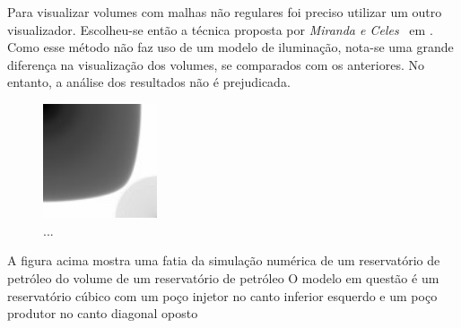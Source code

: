 	Para visualizar volumes com malhas não regulares foi preciso utilizar um outro visualizador. Escolheu-se então a técnica proposta por \textit{Miranda e Celes}~\cite{miranda} em . Como esse método não faz uso de um modelo de iluminação, nota-se uma grande diferença na visualização dos volumes, se comparados com os anteriores. No entanto, a análise dos resultados não é prejudicada.
	
\begin{figure}[h]
	\centering
	\includegraphics[width=0.3\textwidth]{images/r_vrep_so_slice}
	\caption{...}
\end{figure}

	A figura acima mostra uma fatia da simulação numérica de um reservatório de petróleo do volume de um reservatório de petróleo 
	O modelo em questão é um reservatório cúbico com um poço injetor no canto inferior esquerdo e um poço produtor no canto diagonal oposto

